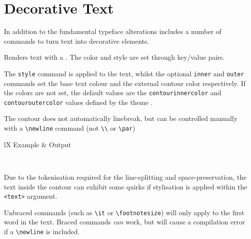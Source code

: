 			\newpage
	\section{Decorative Text}
		In addition to the fundamental typeface alterations \rpgtex{} includes a number of commands to turn text into decorative elements.
		\begin{macrolist}
				{	
					Renders text with a . The color and style are set through key/value pairs.
				}
				{
				}
				{
					The \texttt{style} command is applied to the text, whilst the optional \texttt{inner} and \texttt{outer} commands set the base text colour and the external contour color respectively. If the colors are not set, the default values are the \verb|contourinnercolor| and \verb|contouroutercolor| values defined by the theme .
					
					The contour does not automatically linebreak, but can be controlled manually with a \verb|\newline| command (not \verb|\\| or \texttt{\textbackslash{}par})
					
					\begin{RpgTable}{lX}
						Example & Output \\
					\end{RpgTable}					
					~

					Due to the tokenisation required for the line-splitting and space-preservation, the text inside the contour can exhibit some quirks if stylisation is applied within the \verb|<text>| argument. 

					Unbraced commands (such as \verb|\it| or \verb|\footnotesize|) will only apply to the first word in the text. Braced commands \textit{can} work, but will cause a compilation error if a \verb|\newline| is included. 

}
\end{macrolist}
